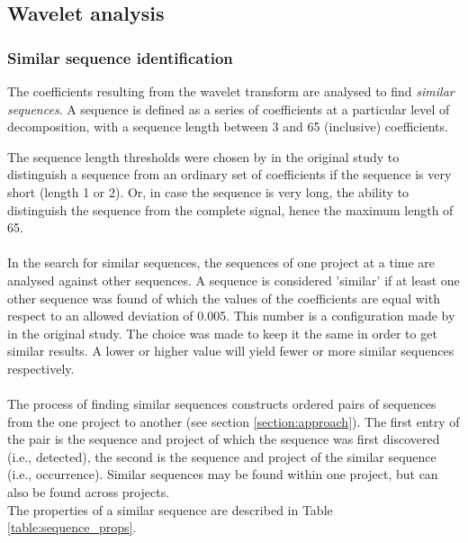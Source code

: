 \subsection{Wavelet analysis}
\subsubsection{Similar sequence identification}
The coefficients resulting from the wavelet transform are analysed to find
\textit{similar sequences}. A sequence is defined as a series of coefficients
at a particular level of decomposition, with a sequence length between 3 and 65
(inclusive) coefficients.

The sequence length thresholds were chosen by \citet{karus2013} in the original
study to distinguish a sequence from an ordinary set of coefficients if the
sequence is very short (length 1 or 2). Or, in case the sequence is very long,
the ability to distinguish the sequence from the complete signal, hence the
maximum length of 65.

\paragraph{}
In the search for similar sequences, the sequences of one project at a time are
analysed against other sequences. A sequence is considered 'similar' if at
least one other sequence was found of which the values of the coefficients are
equal with respect to an allowed deviation of 0.005. This number is a
configuration made by \citeauthor{karus2013} in the original study.
The choice was made to keep it the same in order to get similar results.
A lower or higher value will yield fewer or more similar sequences
respectively.

\paragraph{}
The process of finding similar sequences constructs ordered pairs of sequences
from the one project to another (see section \ref{section:approach}). The first
entry of the pair is the sequence and project of which the sequence was first
discovered (i.e., detected), the second is the sequence and project of the
similar sequence (i.e., occurrence). Similar sequences may be found within one
project, but can also be found across projects.\\

\noindent
The properties of a similar sequence are described in Table
\ref{table:sequence_props}.

